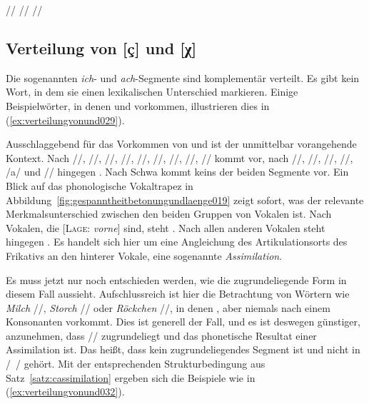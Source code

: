 \begin{exe}
  \ex\label{ex:gespanntheitbetonungundlaenge028} \begin{xlist}
    \ex // \phopro \textipa{[ve:k]}
    \ex // \phopro \textipa{[h\o:l@]}
    \ex // \phopro \textipa{[Po:f@n]}
  \end{xlist}
\end{exe}

\subsection{Verteilung von [ç] und [χ]}
\label{sec:verteilungvonund}

Die sogenannten \textit{ich}- und \textit{ach}-Segmente sind komplementär verteilt.
Es gibt kein Wort, in dem sie einen lexikalischen Unterschied markieren.
Einige Beispielwörter, in denen \textipa{[\c{c}]} und \textipa{[X]} vorkommen, illustrieren dies in (\ref{ex:verteilungvonund029}).

\begin{exe}
  \ex\label{ex:verteilungvonund029}
  \begin{xlist}
  \end{xlist}
\end{exe}

Ausschlaggebend für das Vorkommen von \textipa{[\c{c}]} und \textipa{[X]} ist der unmittelbar vorangehende Kontext.
Nach //, //, //, //, //, //, //, /\textipa{\o}/, /\textipa{\oe}/ kommt \textipa{[\c{c}]} vor, nach //, //, //, //, /a/ und // hingegen \textipa{[X]}.
Nach Schwa kommt keins der beiden Segmente vor.
Ein Blick auf das phonologische Vokaltrapez in Abbildung~\ref{fig:gespanntheitbetonungundlaenge019} zeigt sofort, was der relevante Merkmalsunterschied zwischen den beiden Gruppen von Vokalen ist.
Nach Vokalen, die [\textsc{Lage}: \textit{vorne}] sind, steht \textipa{[\c{c}]}.
Nach allen anderen Vokalen steht hingegen \textipa{[X]}.
Es handelt sich hier um eine Angleichung des Artikulationsorts des Frikativs an den hinterer Vokale, eine sogenannte \textit{Assimilation}.

Es muss jetzt nur noch entschieden werden, wie die zugrundeliegende Form in diesem Fall aussieht.
Aufschlussreich ist hier die Betrachtung von Wörtern wie \textit{Milch} //, \textit{Storch} // oder \textit{Röckchen} //, in denen \textipa{[\c{c}]}, aber niemals \textipa{[X]} nach einem Konsonanten vorkommt.
Dies ist generell der Fall, und es ist deswegen günstiger, anzunehmen, dass // zugrundeliegt und \textipa{[X]} das phonetische Resultat einer Assimilation ist.
Das heißt, dass \textipa{[X]} kein zugrundeliegendes Segment ist und nicht in /~/ gehört.
Mit der entsprechenden Strukturbedingung aus Satz~\ref{satz:cassimilation} ergeben sich die Beispiele wie in (\ref{ex:verteilungvonund032}).

